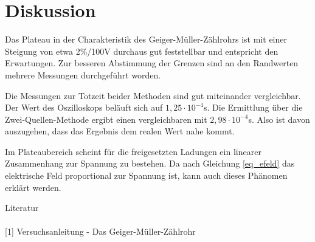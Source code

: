 \section{Diskussion}
Das Plateau in der Charakteristik des Geiger-Müller-Zählrohrs ist mit einer Steigung von etwa 2\%/100V durchaus gut feststellbar
und entspricht den Erwartungen. Zur besseren Abstimmung der Grenzen sind an den Randwerten mehrere Messungen durchgeführt worden.

Die Messungen zur Totzeit beider Methoden sind gut miteinander vergleichbar. Der Wert des Oszilloskops beläuft sich auf
$1,25 \cdot 10^{-4}$s. Die Ermittlung über die Zwei-Quellen-Methode ergibt einen vergleichbaren mit $2,98 \cdot 10^{-4}$s. Also ist
davon auszugehen, dass das Ergebnis dem realen Wert nahe kommt.

Im Plateaubereich scheint für die freigesetzten Ladungen ein linearer Zusammenhang zur Spannung zu bestehen. Da nach Gleichung \eqref{eq_efeld}
das elektrische Feld proportional zur Spannung ist, kann auch dieses Phänomen erklärt werden.

\parskip 50pt
\Large{Literatur}\\\\
\large{[1] Versuchsanleitung - Das Geiger-Müller-Zählrohr}\\\\




